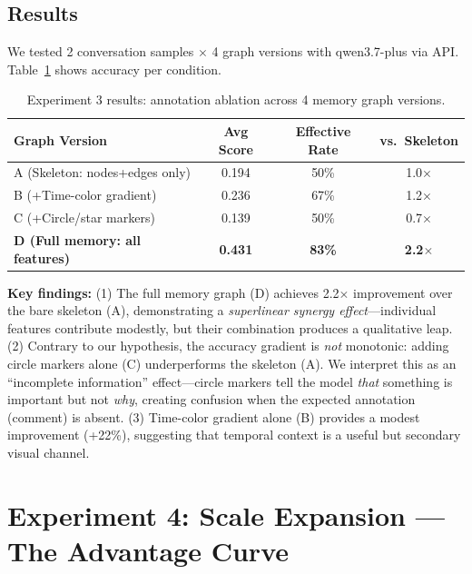\documentclass[11pt,a4paper]{article}
\begin{document}
\subsection{Results}

We tested 2 conversation samples $\times$ 4 graph versions with qwen3.7-plus via API. Table~\ref{tab:exp3_res} shows accuracy per condition.

\begin{table}[h]
\centering\footnotesize
\caption{Experiment 3 results: annotation ablation across 4 memory graph versions.}
\label{tab:exp3_res}
\begin{tabular}{lccc}
\toprule
\textbf{Graph Version} & \textbf{Avg Score} & \textbf{Effective Rate} & \textbf{vs.\ Skeleton} \\
\midrule
A (Skeleton: nodes+edges only)        & 0.194 & 50\% & 1.0$\times$ \\
B (+Time-color gradient)              & 0.236 & 67\% & 1.2$\times$ \\
C (+Circle/star markers)              & 0.139 & 50\% & 0.7$\times$ \\
\textbf{D (Full memory: all features)}& \textbf{0.431} & \textbf{83\%} & \textbf{2.2$\times$} \\
\bottomrule
\end{tabular}
\end{table}

\textbf{Key findings:} (1) The full memory graph (D) achieves 2.2$\times$ improvement over the bare skeleton (A), demonstrating a \textit{superlinear synergy effect}---individual features contribute modestly, but their combination produces a qualitative leap. (2) Contrary to our hypothesis, the accuracy gradient is \textit{not} monotonic: adding circle markers alone (C) underperforms the skeleton (A). We interpret this as an ``incomplete information'' effect---circle markers tell the model \textit{that} something is important but not \textit{why}, creating confusion when the expected annotation (comment) is absent. (3) Time-color gradient alone (B) provides a modest improvement (+22\%), suggesting that temporal context is a useful but secondary visual channel.


\section{Experiment 4: Scale Expansion — The Advantage Curve}
\end{document}

